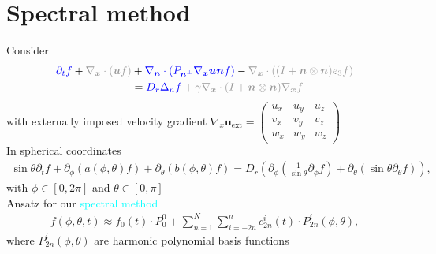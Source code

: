 \section{Spectral method}
\begin{frame}
	\scriptsize
	Consider 
	\begin{align}
		\textcolor{blue}{\partial_t f}+ \textcolor{gray!80}{\nabla_{\boldsymbol{x}} \cdot(\boldsymbol{u} f)} & +\textcolor{blue}{\nabla_{\boldsymbol{n}} \cdot\left(P_{\boldsymbol{n}^{\perp}} \nabla_{\boldsymbol{x}} \boldsymbol{u} \boldsymbol{n} f\right)}-\textcolor{gray!80}{\nabla_{\boldsymbol{x}} \cdot\left((I+\boldsymbol{n} \otimes \boldsymbol{n}) e_3 f\right)} \notag \\
		& = \textcolor{blue}{D_r \Delta_n f}+\textcolor{gray!80}{\gamma \nabla_{\boldsymbol{x}} \cdot(I+\boldsymbol{n} \otimes \boldsymbol{n}) \nabla_{\boldsymbol{x}} f} \label{SmochEq_kurz}
	\end{align}
    with externally imposed velocity gradient $\nabla_x \boldsymbol{u}_{\mathrm{ext}} = \left(\begin{array}{lll}
    	u_{x} & u_{y} & u_{z} \\
    	v_{x} & v_{y} & v_{z} \\
    	w_{x} & w_{y} & w_{z}
    \end{array}\right)$\\
	\vspace{12pt}
	\pause
	In spherical coordinates
	\begin{align}
		\sin \theta \partial_t f + \partial_\phi\left(a(\phi, \theta) f\right)+\partial_\theta\left(b(\phi, \theta) f\right) = D_r \left(\partial_\phi\left(\frac{1}{\sin \theta} \partial_\phi f\right)+\partial_\theta\left(\sin \theta \partial_\theta f\right)\right), \label{Smochluch_S2}
	\end{align}
	with $\phi \in [0, 2 \pi]$ and $\theta \in [0, \pi]$\\
	\vspace{12pt}
	\pause
   	Ansatz for our \textcolor{cyan}{spectral method}
	\begin{align}
		f(\phi, \theta, t) \approx f_0(t) \cdot P_0^0 + \sum_{n=1}^{N} \sum_{i=-2n}^{n} c^i_{2n}(t) \cdot P^i_{2n}(\phi, \theta), \label{ansatz}
	\end{align}
	where $P^i_{2n}(\phi, \theta)$ are harmonic polynomial basis functions %
\end{frame}


